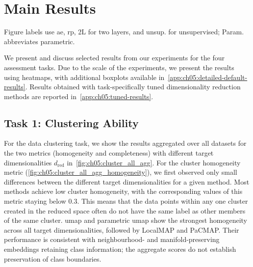 \FloatBarrier
\section{Main Results}
\label{sec:ch05:res}

Figure labels use \gls{ae}, \gls{rp}, 2L for two layers, and unsup. for unsupervised; Param. abbreviates parametric.

We present and discuss selected results from our experiments for the four assessment tasks. Due to the scale of the experiments, we present the results using heatmaps, with additional boxplots available in~\cref{app:ch05:detailed-default-results}. Results obtained with task-specifically tuned dimensionality reduction methods are reported in~\cref{app:ch05:tuned-results}.




\FloatBarrier
\subsection{Task 1: Clustering Ability}
\label{sec:ch05:res-ml-task1}

For the data clustering task, we show the results aggregated over all datasets for the two metrics (homogeneity and completeness) with different target dimensionalities $d_{\mathrm{red}}$ in~\cref{fig:ch05:cluster_all_agg}.
For the cluster homogeneity metric (\cref{fig:ch05:cluster_all_agg_homogeneity}), we first observed only small differences between the different target dimensionalities for a given method.
Most methods achieve low cluster homogeneity, with the corresponding values of this metric staying below $0.3$.
This means that the data points within any one cluster created in the reduced space often do not have the same label as other members of the same cluster.
\gls{umap} and parametric \gls{umap} show the strongest homogeneity across all target dimensionalities, followed by LocalMAP and PaCMAP. Their performance is consistent with neighbourhood- and manifold-preserving embeddings retaining class information; the aggregate scores do not establish preservation of class boundaries.


